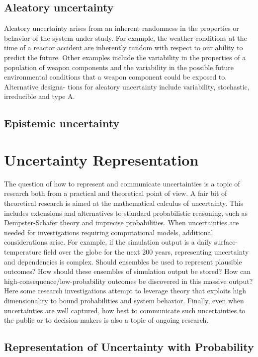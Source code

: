 \subsection{Aleatory uncertainty}
Aleatory uncertainty arises from an inherent randomness in the properties or behavior of the system under study. For example, the weather conditions at the time of a reactor accident are inherently random with respect to our ability to predict the future. Other examples include the variability in the properties of a population of weapon components and the variability in the possible future environmental conditions that a weapon component could be exposed to. Alternative designa- tions for aleatory uncertainty include variability, stochastic, irreducible and type A. \cite{Helton2009}

\subsection{Epistemic uncertainty}

\section{Uncertainty Representation}
The question of how to represent and communicate uncertainties is a topic of research both from a practical and theoretical point of view. A fair bit of theoretical research is aimed at the mathematical calculus of uncertainty. This includes extensions and alternatives to standard probabilistic reasoning, such as Dempster-Schafer theory and imprecise probabilities. When uncertainties are needed for investigations requiring computational models, additional considerations arise. For example, if the simulation output is a daily surface-temperature field over the globe for the next 200 years, representing uncertainty and dependencies is complex. Should ensembles be used to represent plausible outcomes? How should these ensembles of simulation output be stored? How can high-consequence/low-probability outcomes be discovered in this massive output? Here some research investigations attempt to leverage theory that exploits high dimensionality to bound probabilities and system behavior. Finally, even when uncertainties are well captured, how best to communicate such uncertainties to the public or to decision-makers is also a topic of ongoing research. 

\cite{Helton2010a}

\subsection{Representation of Uncertainty with Probability}

